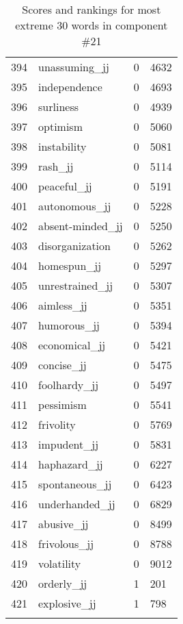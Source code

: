 \begin{longtable}[!htbp]{| rlr@{.}l |}
    394 & unassuming\_jj & 0 & 4632 \\
    395 & independence & 0 & 4693 \\
    396 & surliness & 0 & 4939 \\
    397 & optimism & 0 & 5060 \\
    398 & instability & 0 & 5081 \\
    399 & rash\_jj & 0 & 5114 \\
    400 & peaceful\_jj & 0 & 5191 \\
    401 & autonomous\_jj & 0 & 5228 \\
    402 & absent-minded\_jj & 0 & 5250 \\
    403 & disorganization & 0 & 5262 \\
    404 & homespun\_jj & 0 & 5297 \\
    405 & unrestrained\_jj & 0 & 5307 \\
    406 & aimless\_jj & 0 & 5351 \\
    407 & humorous\_jj & 0 & 5394 \\
    408 & economical\_jj & 0 & 5421 \\
    409 & concise\_jj & 0 & 5475 \\
    410 & foolhardy\_jj & 0 & 5497 \\
    411 & pessimism & 0 & 5541 \\
    412 & frivolity & 0 & 5769 \\
    413 & impudent\_jj & 0 & 5831 \\
    414 & haphazard\_jj & 0 & 6227 \\
    415 & spontaneous\_jj & 0 & 6423 \\
    416 & underhanded\_jj & 0 & 6829 \\
    417 & abusive\_jj & 0 & 8499 \\
    418 & frivolous\_jj & 0 & 8788 \\
    419 & volatility & 0 & 9012 \\
    420 & orderly\_jj & 1 & 201 \\
    421 & explosive\_jj & 1 & 798 \\
    \hline
    \caption{Scores and rankings for most extreme 30 words in component \#21} \\
\end{longtable}
